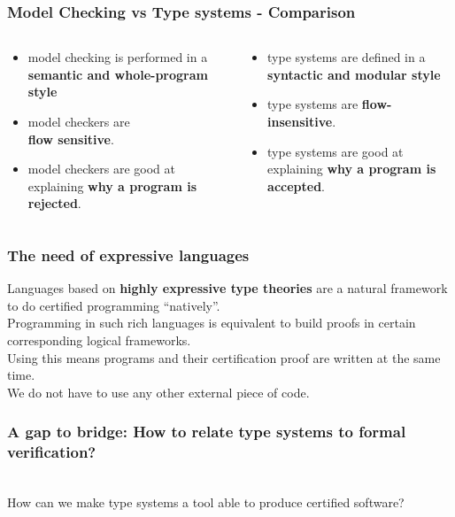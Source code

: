 \begin{frame}
\frametitle{Model Checking vs Type systems - Comparison}
\begin{columns}
  \begin{column}{0.5\textwidth}
    \begin{itemize}
	  \item model checking is performed in a \textbf{semantic and whole-program style}
	  \item model checkers are \\ \textbf{flow sensitive}.
	  \item model checkers are good at explaining \textbf{why a program is rejected}. 
    \end{itemize}  
  \end{column}
  \begin{column}{0.5\textwidth}
    \begin{itemize}
    	\item type systems are defined in a \textbf{syntactic and modular style}
    	\item type systems are \textbf{flow-insensitive}.
    	\item type systems are good at explaining \textbf{why a program is accepted}.
    \end{itemize}
  \end{column}
\end{columns}
\end{frame}


\begin{frame}
\frametitle{The need of expressive languages}
Languages based on \textbf{highly expressive type theories} are a natural framework to do certified programming “natively”.
\\ \medskip
Programming in such rich languages is equivalent to build proofs in certain corresponding logical frameworks.
\\ \medskip
Using this means programs and their certification proof are written at the same time. \\
We do not have to use any other external piece of code.
\end{frame}


\begin{frame}
\frametitle{A gap to bridge: How to relate type systems to formal verification?}
\textbf{}
\\ \medskip
How can we make type systems a tool able to produce certified software?
\end{frame}

